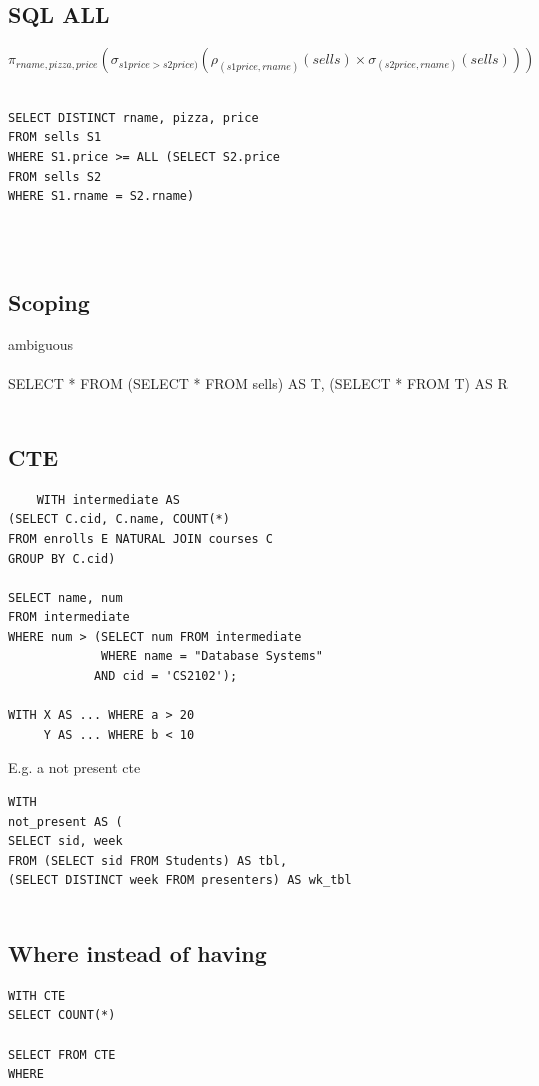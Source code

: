 \documentclass[11pt]{article}
\begin{document}
    \subsection*{SQL ALL}
      $\pi_{rname, pizza, price} ( \sigma_{s1price > s2price)} (\rho_{(s1price, rname)}(sells)  \times \sigma_{(s2price, rname)}(sells) ))$
      \\\\
  \begin{verbatim}
SELECT DISTINCT rname, pizza, price
FROM sells S1
WHERE S1.price >= ALL (SELECT S2.price
FROM sells S2 
WHERE S1.rname = S2.rname)

    \end{verbatim}\\\\
 \subsection*{Scoping}
 ambiguous\\
 \\
SELECT *
FROM (SELECT * FROM sells) AS T,
(SELECT * FROM T) AS R
\\
\\
\subsection*{CTE}
\begin{verbatim}
	WITH intermediate AS
(SELECT C.cid, C.name, COUNT(*)
FROM enrolls E NATURAL JOIN courses C
GROUP BY C.cid)

SELECT name, num
FROM intermediate
WHERE num > (SELECT num FROM intermediate 
             WHERE name = "Database Systems"
            AND cid = 'CS2102');
            
WITH X AS ... WHERE a > 20
	 Y AS ... WHERE b < 10
	\end{verbatim} 
E.g. a not present cte
\begin{verbatim}
WITH 
not_present AS (
SELECT sid, week
FROM (SELECT sid FROM Students) AS tbl,
(SELECT DISTINCT week FROM presenters) AS wk_tbl
	
\end{verbatim}
\newpage
\subsection*{Where instead of having}
\begin{verbatim}
WITH CTE
SELECT COUNT(*)

SELECT FROM CTE
WHERE
\end{verbatim}
\end{document}
